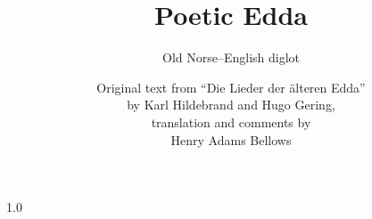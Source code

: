 \documentclass{scrbook}
\newcommand{\tocnumwidth}{5em}
\newcommand{\tocspacing}{1.0} %
\newcommand{\tocmarginwidth}{2.55em} %
\newcommand{\titlesize}{48pt}
\newcommand{\tocnumwidth}{5em}
\newcommand{\tocspacing}{0.9} %
\newcommand{\tocmarginwidth}{2.55em} %
\newcommand{\tocnumwidth}{5em}
\newcommand{\tocspacing}{0.9}
\newcommand{\tocmarginwidth}{2.55em} %
\newcommand{\ndash}{--}
\begin{document}
\title{\fontsize{\titlesize}{\titlesize}\selectfont Poetic Edda}
\subtitle{\Large{Old Norse{\ndash}English diglot}}
\author{
Original text from ``Die Lieder der älteren Edda'' \\
by Karl Hildebrand and Hugo Gering, \\
translation and comments by \\
Henry Adams Bellows
}

\date{}
\publishers{\small{Typeset by Bogdan Opanchuk, \\ compiled on \today \\ Melbourne, Australia}}

\maketitle

\frontmatter

\clearpage
\begingroup

	\pagestyle{empty}
	\renewcommand*{\chapterpagestyle}{empty}

	\renewcommand{\@pnumwidth}{\tocnumwidth}
	\renewcommand{\@tocrmarg}{\tocmarginwidth plus1fil} %

	\begin{spacing}{\tocspacing}
	\tableofcontents
	\end{spacing}

\clearpage
\endgroup

\mainmatter

\end{document}
